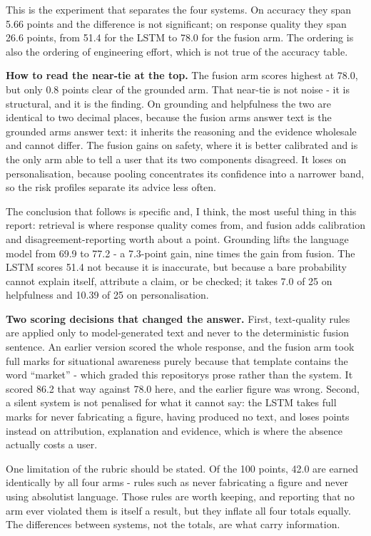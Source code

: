 This is the experiment that separates the four systems. On accuracy they
span 5.66 points and the difference is not significant; on response
quality they span 26.6 points, from 51.4 for the LSTM to 78.0 for the
fusion arm. The ordering is also the ordering of engineering effort,
which is not true of the accuracy table.

\textbf{How to read the near-tie at the top.} The fusion arm scores
highest at 78.0, but only 0.8 points clear of the grounded arm. That
near-tie is not noise - it is structural, and it is the finding. On
grounding and helpfulness the two are identical to two decimal places,
because the fusion arm\textquotesingle s answer text is the grounded
arm\textquotesingle s answer text: it inherits the reasoning and the
evidence wholesale and cannot differ. The fusion gains on safety, where
it is better calibrated and is the only arm able to tell a user that its
two components disagreed. It loses on personalisation, because pooling
concentrates its confidence into a narrower band, so the risk profiles
separate its advice less often.

The conclusion that follows is specific and, I think, the most useful
thing in this report: retrieval is where response quality comes from,
and fusion adds calibration and disagreement-reporting worth about a
point. Grounding lifts the language model from 69.9 to 77.2 - a
7.3-point gain, nine times the gain from fusion. The LSTM scores 51.4
not because it is inaccurate, but because a bare probability cannot
explain itself, attribute a claim, or be checked; it takes 7.0 of 25 on
helpfulness and 10.39 of 25 on personalisation.

\textbf{Two scoring decisions that changed the answer.} First,
text-quality rules are applied only to model-generated text and never to
the deterministic fusion sentence. An earlier version scored the whole
response, and the fusion arm took full marks for situational awareness
purely because that template contains the word ``market'' - which graded
this repository\textquotesingle s prose rather than the system. It
scored 86.2 that way against 78.0 here, and the earlier figure was
wrong. Second, a silent system is not penalised for what it cannot say:
the LSTM takes full marks for never fabricating a figure, having
produced no text, and loses points instead on attribution, explanation
and evidence, which is where the absence actually costs a user.

One limitation of the rubric should be stated. Of the 100 points, 42.0
are earned identically by all four arms - rules such as never
fabricating a figure and never using absolutist language. Those rules
are worth keeping, and reporting that no arm ever violated them is
itself a result, but they inflate all four totals equally. The
differences between systems, not the totals, are what carry information.

